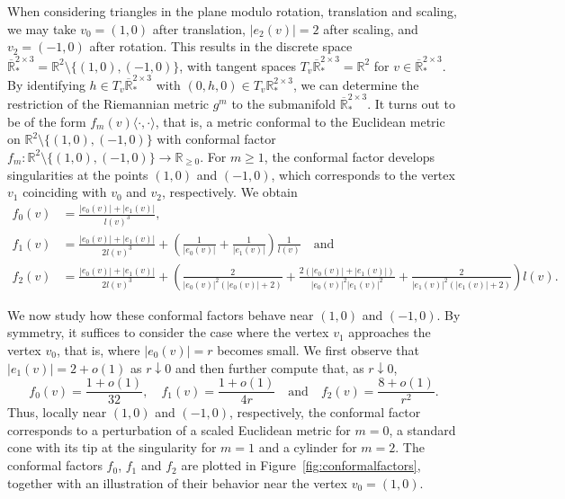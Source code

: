 \documentclass[11pt]{article}
\newcommand{\R}{\mathbb{R}}
\begin{document}
When considering triangles in the plane modulo rotation, translation and scaling, we may take $v_0=(1,0)$ after translation, $|e_2(v)|=2$ after scaling, and $v_2=(-1,0)$ after rotation. This results in the discrete space $\overline{\R}^{2\times 3}_* = \R^2\setminus \{(1,0),(-1,0)\}$, with tangent spaces $T_v\overline{\R}^{2\times 3}_*=\R^2$ for $v\in\overline{\R}^{2\times 3}_*$. By identifying $h\in T_v\overline{\R}^{2\times 3}_*$ with $(0,h,0)\in T_v\R^{2\times 3}_*$, we can determine the restriction of the Riemannian metric $g^m$ to the submanifold $\overline{\R}^{2\times 3}_*$. It turns out to be of the form $f_m(v)\langle\cdot,\cdot\rangle$, that is, a metric conformal to the Euclidean metric on $\R^2\setminus \{(1,0),(-1,0)\}$ with conformal factor $f_m\colon\R^2\setminus \{(1,0),(-1,0)\}\to\R_{\geq 0}$. For $m\geq 1$, the conformal factor develops singularities at the points $(1,0)$ and $(-1,0)$, which corresponds to the vertex $v_1$ coinciding with $v_0$ and $v_2$, respectively. We obtain 
\begin{align*}
    f_0(v)&=\frac{|e_0(v)|+|e_1(v)|}{l(v)^3}, \\
    f_1(v)&=\frac{|e_0(v)|+|e_1(v)|}{2l(v)^3}+\left(\frac{1}{|e_0(v)|}+\frac{1}{|e_1(v)|}\right)\frac{1}{l(v)} \quad\text{and}\\
    f_2(v)&=\frac{|e_0(v)|+|e_1(v)|}{2l(v)^3}+\left(\frac{2}{|e_0(v)|^2(|e_0(v)|+2)}+\frac{2(|e_0(v)|+|e_1(v)|)}{|e_0(v)|^2|e_1(v)|^2}+\frac{2}{|e_1(v)|^2(|e_1(v)|+2)}\right)l(v).
\end{align*}

We now study how these conformal factors behave near $(1,0)$ and $(-1,0)$. By symmetry, it suffices to consider the case where the vertex $v_1$ approaches the vertex $v_0$, that is, where $|e_0(v)|=r$ becomes small. We first observe that $|e_1(v)|=2+o(1)$ as $r\downarrow 0$ and then further compute that, as $r\downarrow 0$, 
\begin{displaymath}
    f_0(v)=\frac{1+o(1)}{32},\quad
    f_1(v)=\frac{1+o(1)}{4r}\quad\text{and}\quad
    f_2(v)=\frac{8+o(1)}{r^2}.
\end{displaymath}
Thus, locally near $(1,0)$ and $(-1,0)$, respectively, the conformal factor corresponds to a perturbation of a scaled Euclidean metric for $m=0$, a standard cone with its tip at the singularity for $m=1$ and a cylinder for $m=2$. The conformal factors $f_0$, $f_1$ and $f_2$ are plotted in Figure~\ref{fig:conformalfactors}, together with an illustration of their behavior near the vertex $v_0=(1,0)$.
\end{document}
